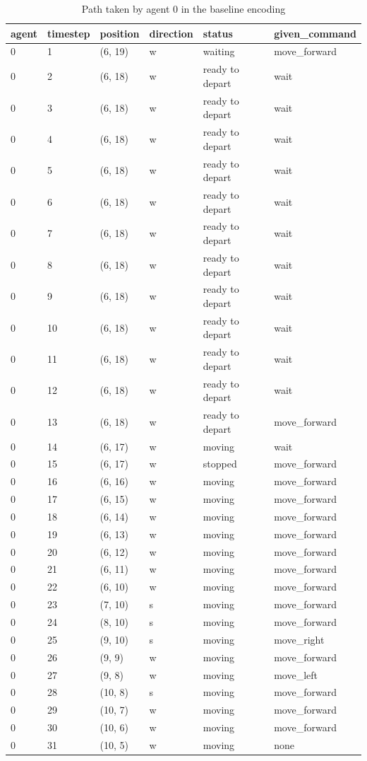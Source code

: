 \begin{table}[H]
  \centering
  \caption{Path taken by agent 0 in the baseline encoding}
  \label{tab:baseline0}
  \begin{tabular}{llllll}
    \toprule
    agent & timestep & position & direction & status & given\_command \\
    \midrule
0 & 1 & (6, 19) & w & waiting & move\_forward \\
0 & 2 & (6, 18) & w & ready to depart & wait \\
0 & 3 & (6, 18) & w & ready to depart & wait \\
0 & 4 & (6, 18) & w & ready to depart & wait \\
0 & 5 & (6, 18) & w & ready to depart & wait \\
0 & 6 & (6, 18) & w & ready to depart & wait \\
0 & 7 & (6, 18) & w & ready to depart & wait \\
0 & 8 & (6, 18) & w & ready to depart & wait \\
0 & 9 & (6, 18) & w & ready to depart & wait \\
0 & 10 & (6, 18) & w & ready to depart & wait \\
0 & 11 & (6, 18) & w & ready to depart & wait \\
0 & 12 & (6, 18) & w & ready to depart & wait \\
0 & 13 & (6, 18) & w & ready to depart & move\_forward \\
0 & 14 & (6, 17) & w & moving & wait \\
0 & 15 & (6, 17) & w & stopped & move\_forward \\
0 & 16 & (6, 16) & w & moving & move\_forward \\
0 & 17 & (6, 15) & w & moving & move\_forward \\
0 & 18 & (6, 14) & w & moving & move\_forward \\
0 & 19 & (6, 13) & w & moving & move\_forward \\
0 & 20 & (6, 12) & w & moving & move\_forward \\
0 & 21 & (6, 11) & w & moving & move\_forward \\
0 & 22 & (6, 10) & w & moving & move\_forward \\
0 & 23 & (7, 10) & s & moving & move\_forward \\
0 & 24 & (8, 10) & s & moving & move\_forward \\
0 & 25 & (9, 10) & s & moving & move\_right \\
0 & 26 & (9, 9) & w & moving & move\_forward \\
0 & 27 & (9, 8) & w & moving & move\_left \\
0 & 28 & (10, 8) & s & moving & move\_forward \\
0 & 29 & (10, 7) & w & moving & move\_forward \\
0 & 30 & (10, 6) & w & moving & move\_forward \\
0 & 31 & (10, 5) & w & moving & none \\
    \bottomrule
  \end{tabular}
\end{table}